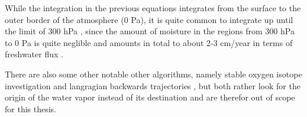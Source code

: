 While the integration in the previous equations integrates from the surface to the outer border of the atmosphere (0 Pa), it is quite common to integrate up until the limit of 300 hPa \cite{ayantobo_integrated_2022, zhu_proposed_1998, kim_ensos_2015, guirguis_circulation_2018}, since the amount of moisture in the regions from 300 hPa to 0 Pa is quite neglible and amounts in total to about 2-3 cm/year in terms of freshwater flux \cite{zhou_atmospheric_2005}.

There are also some other notable other algorithms, namely stable oxygen isotope investigation \cite{ma_atmospheric_nodate} and langragian backwards trajectories \cite{zhao_lagrangian_2021}, but both rather look for the origin of the  water vapor instead of its destination and are therefor out of scope for this thesis.

%
%
%
%
%
%
%
%
%
%

